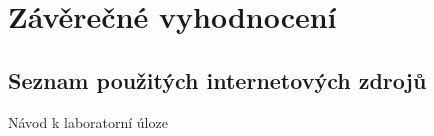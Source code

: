 \documentclass[a4paper,12pt]{article}   %
\begin{document}
\section{Závěrečné vyhodnocení}



\clearpage
\renewcommand{\refname}{Seznam použité literatury a~zdrojů informací} 

\begin{thebibliography}{99}

\subsection*{Seznam použitých internetových zdrojů}
     Návod k laboratorní úloze
    
\end{thebibliography}
\end{document}
